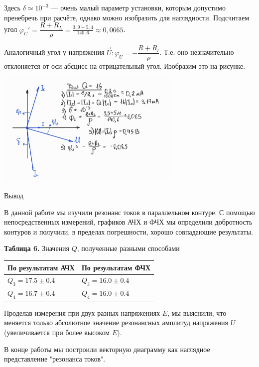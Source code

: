 \documentclass{article}
\begin{document}
Здесь $ \delta \simeq 10^{-3}$ --- очень малый параметр установки, которым допустимо пренебречь при расчёте, однако можно изобразить для наглядности. Подсчитаем угол $ \varphi_C' =   \dfrac{R + R_L}{\rho} =\frac{3,9+5,4}{140,6}\approx 0,0665 $. 

Аналогичный угол у напряжения $ \vec{U}: \varphi_U = - \dfrac{R + R_l}{\rho} $. Т.е. оно незначительно отклоняется от оси абсцисс на отрицательный угол. Изобразим это на рисунке. 

\begin{center}
    \includegraphics[width=9cm]{VDiag.jpg}
\end{center}


\begin{center}
    \raggedleft
        \underline{\underline{\LARGE {Вывод}}}
\end{center}

В данной работе мы изучили резонанс токов в параллельном контуре. С помощью непосредственных измерений, графиков АЧХ и ФЧХ мы определили добротность контуров и получили, в пределах погрешности, хорошо совпадающие результаты. 

\begin{table}[h]
    \centering
    \begin{center}
        \textbf{Таблица 6.} Значения \(Q\), полученные разными способами
    \end{center}
    \begin{tabular}{ |p{4cm}|p{4cm}|}
    \hline
        По результатам АЧХ & По результатам ФЧХ \\
    \hline
        \(Q_{3} = 17.5 \pm 0.4\) & \(Q_{3} = 16.0 \pm 0.4\) \\ \(Q_{4} = 16.7 \pm 0.4\) & \(Q_{4} = 16.0 \pm 0.4\) \\
    \hline
    \end{tabular}
\end{table} 

Проделав измерения при двух разных напряжениях $ E $, мы выяснили, что меняется только абсолютное значение резонансных амплитуд напряжения $ U $ (увеличивается при более высоком $ E $). 

В конце работы мы построили векторную диаграмму как наглядное представление "резонанса токов". 
\end{document}
